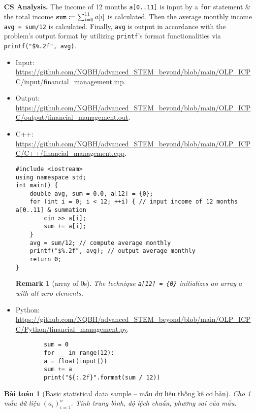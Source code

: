 \documentclass{article}
\newtheorem{baitoan}{Bài toán}
\newtheorem{remark}{Remark}
\begin{document}
\textbf{\textsf{CS Analysis.}} The income of 12 months {\tt a[0..11]} is input by a {\tt for} statement \& the total income ${\tt sum}\coloneqq\sum_{i=0}^{11} a[i]$ is calculated. Then the average monthly income {\tt avg = sum/12} is calculated. Finally, {\tt avg} is output in accordance with the problem's output format by utilizing {\tt printf}'s format functionalities via \verb|printf("$%.2f", avg)|.
\begin{itemize}
	\item Input: \url{https://github.com/NQBH/advanced_STEM_beyond/blob/main/OLP_ICPC/input/financial_management.inp}.
	\item Output: \url{https://github.com/NQBH/advanced_STEM_beyond/blob/main/OLP_ICPC/output/financial_management.out}.
	\item C++: \url{https://github.com/NQBH/advanced_STEM_beyond/blob/main/OLP_ICPC/C++/financial_management.cpp}.
\begin{verbatim}
#include <iostream>
using namespace std;
int main() {
    double avg, sum = 0.0, a[12] = {0};
    for (int i = 0; i < 12; ++i) { // input income of 12 months a[0..11] & summation
        cin >> a[i];
        sum += a[i];
    }
    avg = sum/12; // compute average monthly
    printf("$%.2f", avg); // output average monthly
    return 0;
}		
\end{verbatim}
	
	\begin{remark}[array of 0s]
		The technique \verb|a[12] = {0}| initializes an array $a$ with all zero elements.
	\end{remark}
	\item Python: \url{https://github.com/NQBH/advanced_STEM_beyond/blob/main/OLP_ICPC/Python/financial_management.py}.
	\begin{verbatim}
		sum = 0
		for __ in range(12):
		a = float(input())
		sum += a
		print("${:.2f}".format(sum / 12))
	\end{verbatim}
\end{itemize}

\begin{baitoan}[Basic statistical data sample -- mẫu dữ liệu thống kê cơ bản]
	Cho 1 mẫu dữ liệu $(a_i)_{i=1}^n$. Tính trung bình, độ lệch chuẩn, phương sai của mẫu.
\end{baitoan}
\end{document}
